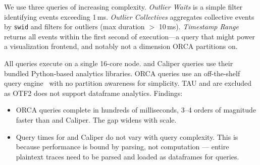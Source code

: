 
\enlargethispage{\baselineskip}

We use three queries of increasing complexity.
\emph{Outlier Waits} is a simple filter identifying \mpiw{} events exceeding 1\,ms.
\emph{Outlier Collectives} aggregates collective events by \texttt{swid} and filters for outliers (max
duration $>$ 10\,ms).
\emph{Timestamp Range} returns all events within the first second of execution---a query that
might power a visualization frontend, and notably not a dimension ORCA partitions on.

All queries execute on a single 16-core node.
\dftracer{} and Caliper queries use their bundled Python-based analytics libraries.
ORCA queries use an off-the-shelf query engine~\cite{:Polars} with no partition awareness for simplicity.
TAU and \scorep{} are excluded as OTF2 does not support dataframe analytics.
Findings:

\begin{itemize}[leftmargin=*]
  \item ORCA queries complete in hundreds of milliseconds, 3--4 orders of magnitude faster than
        \dftracer{} and Caliper.
        The gap widens with scale.
  \item Query times for \dftracer{} and Caliper do not vary with query complexity.
        This is because performance is bound by parsing, not computation --- entire plaintext traces need
        to be parsed and loaded as dataframes for queries.
\end{itemize}

